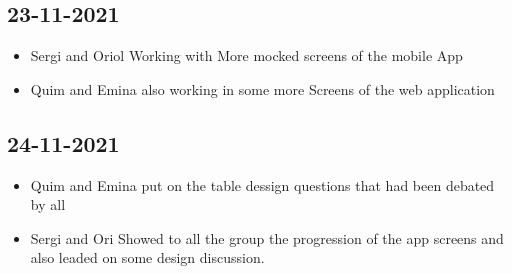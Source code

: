 \documentclass[./main.tex]{subfiles}
\begin{document}

\subsection{23-11-2021}
\begin{itemize}
\item Sergi and Oriol Working with More mocked screens of the mobile App
\item Quim and Emina also working in some more Screens of the web application
\end{itemize}

\subsection{24-11-2021}
\begin{itemize}
  \item Quim and Emina put on the table dessign questions that had been debated by all
  \item Sergi and Ori Showed to all the group the progression of the app screens and also leaded on some design discussion.
\end{itemize}
\end{document}
